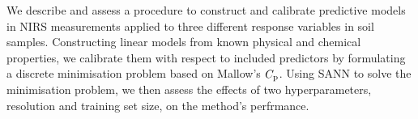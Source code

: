 We describe and assess a procedure to construct and calibrate predictive models in NIRS measurements applied to three different response variables in soil samples.
Constructing linear models from known physical and chemical properties, we calibrate them with respect to included predictors by formulating a discrete minimisation problem based on Mallow's $C_{\mathrm{p}}$.
Using SANN to solve the minimisation problem, we then assess the effects of two hyperparameters, resolution and training set size, on the method's perfrmance.